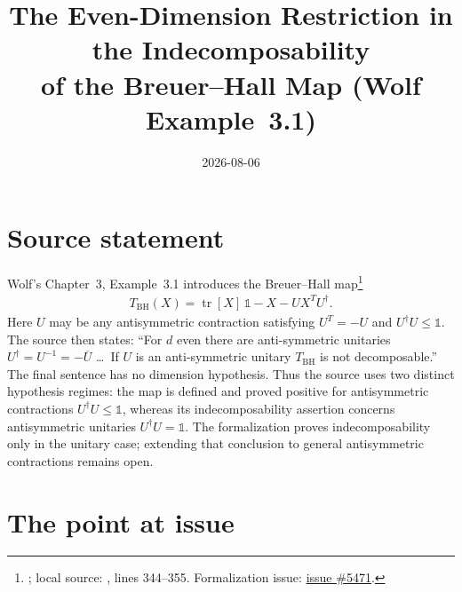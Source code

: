 \documentclass{article}
\title{The Even-Dimension Restriction in the Indecomposability\\
of the Breuer--Hall Map (Wolf Example~3.1)}
\author{}
\date{2026-08-06}
\begin{document}
\maketitle
{}

\section{Source statement}

Wolf's Chapter~3, Example~3.1 introduces the Breuer--Hall
map\footnote{\cite[Chapter~3, Example~3.1]{Wolf2012Quantum}; local source:
, lines
344--355. Formalization issue:
\href{https://github.com/LionSR/TNLean/issues/5471}{issue \#5471}.}
\begin{align}
  T_{\mathrm{BH}}(X)=\operatorname{tr}[X]\,\mathbb 1-X-UX^{T}U^{\dagger}.
  \tag{3.19}
\end{align}
Here $U$ may be any antisymmetric contraction satisfying $U^{T}=-U$ and
$U^{\dagger}U\le\mathbb 1$.  The source then states: ``For $d$ even there are
anti-symmetric unitaries
$U^{\dagger}=U^{-1}=-\overline{U}$ \dots\ If $U$ is an anti-symmetric unitary
$T_{\mathrm{BH}}$ is not decomposable.''  The final sentence has no dimension
hypothesis.  Thus the source uses two distinct hypothesis regimes: the map is
defined and proved positive for antisymmetric contractions
$U^{\dagger}U\le\mathbb 1$, whereas its indecomposability assertion concerns
antisymmetric unitaries $U^{\dagger}U=\mathbb 1$.  The formalization proves
indecomposability only in the unitary case; extending that conclusion to general
antisymmetric contractions remains open.

\section{The point at issue}
\end{document}
